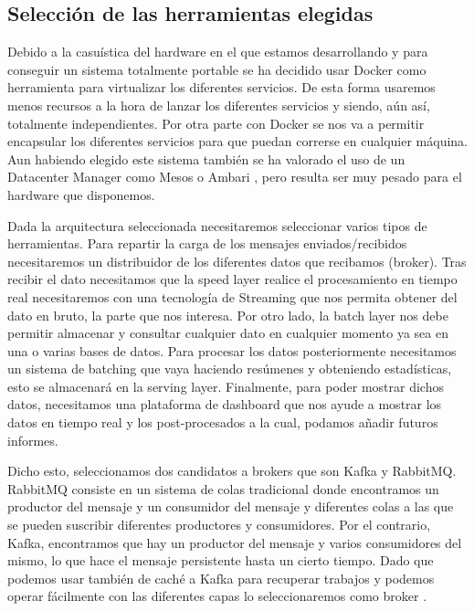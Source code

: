 \subsection{Selección de las herramientas elegidas\label{toolSelect}}

Debido a la casuística del hardware en el que estamos desarrollando y para conseguir un sistema totalmente portable se ha decidido usar Docker como herramienta para virtualizar los diferentes servicios. De esta forma usaremos menos recursos a la hora de lanzar los diferentes servicios y siendo, aún así, totalmente independientes. Por otra parte con Docker se nos va a permitir encapsular los diferentes servicios para que puedan correrse en cualquier máquina. Aun habiendo elegido este sistema también se ha valorado el uso de un Datacenter Manager como Mesos o Ambari \cite{Hrr-1}, pero resulta ser muy pesado para el hardware que disponemos.\par

Dada la arquitectura seleccionada necesitaremos seleccionar varios tipos de herramientas. Para repartir la carga de los mensajes enviados/recibidos necesitaremos un distribuidor de los diferentes datos que recibamos (broker). Tras recibir el dato necesitamos que la speed layer realice el procesamiento en tiempo real necesitaremos con una tecnología de Streaming que nos permita obtener del dato en bruto, la parte que nos interesa. Por otro lado, la batch layer nos debe permitir almacenar y consultar cualquier dato en cualquier momento ya sea en una o varias bases de datos. Para procesar los datos posteriormente necesitamos un sistema de batching que vaya haciendo resúmenes y obteniendo estadísticas, esto se almacenará en la serving layer. Finalmente, para poder mostrar dichos datos, necesitamos una plataforma de dashboard que nos ayude a mostrar los datos en tiempo real y los post-procesados a la cual, podamos añadir futuros informes.\par

Dicho esto, seleccionamos dos candidatos a brokers que son Kafka y RabbitMQ. RabbitMQ consiste en un sistema de colas tradicional donde encontramos un productor del mensaje y un consumidor del mensaje y diferentes colas a las que se pueden suscribir diferentes productores y consumidores. Por el contrario, Kafka, encontramos que hay un productor del mensaje y varios consumidores del mismo, lo que hace el mensaje persistente hasta un cierto tiempo. Dado que podemos usar también de caché a Kafka para recuperar trabajos y podemos operar fácilmente con las diferentes capas lo seleccionaremos como broker \cite{Hrr-2}.\par

